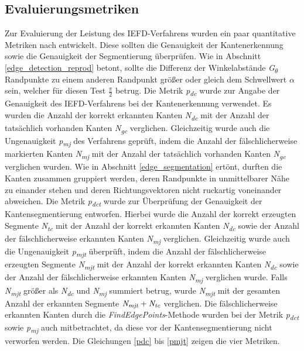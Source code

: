 \subsection{Evaluierungsmetriken} \label{evaluations_metrics}
Zur Evaluierung der Leistung des IEFD-Verfahrens wurden ein paar quantitative Metriken nach \textcite[10]{ni_edge_2016} entwickelt. Diese sollten die Genauigkeit der Kantenerkennung sowie die Genauigkeit der Segmentierung überprüfen. Wie in Abschnitt \ref{edge_detection_reprod} betont, sollte die Differenz der Winkelabstände \textit{G\textsubscript{$\theta$}} Randpunkte zu einem anderen Randpunkt größer oder gleich dem Schwellwert $\alpha$ sein, welcher für diesen Test $\frac{\pi}{2}$ betrug. Die Metrik \textit{p\textsubscript{dc}} wurde zur Angabe der Genauigkeit des IEFD-Verfahrens bei der Kantenerkennung verwendet. Es wurden die Anzahl der korrekt erkannten Kanten \textit{N\textsubscript{dc}} mit der Anzahl der tatsächlich vorhanden Kanten \textit{N\textsubscript{gc}} verglichen. Gleichzeitig wurde auch die Ungenauigkeit \textit{p\textsubscript{mj}} des Verfahrens geprüft, indem die Anzahl der fälschlicherweise markierten Kanten \textit{N\textsubscript{mj}} mit der Anzahl der tatsächlich vorhanden Kanten \textit{N\textsubscript{gc}} verglichen wurden. Wie in Abschnitt \ref{edge_segmentation} ertönt, durften die Kanten zusammen gruppiert werden, deren Randpunkte in unmittelbarer Nähe zu einander stehen und deren Richtungsvektoren nicht ruckartig voneinander abweichen. Die Metrik \textit{p\textsubscript{dct}} wurde zur Überprüfung der Genauigkeit der Kantensegmentierung entworfen. Hierbei wurde die Anzahl der korrekt erzeugten Segmente \textit{N\textsubscript{tc}} mit der Anzahl der korrekt erkannten Kanten \textit{N\textsubscript{dc}} sowie der Anzahl der fälschlicherweise erkannten Kanten \textit{N\textsubscript{mj}} verglichen. Gleichzeitig wurde auch die Ungenauigkeit \textit{p\textsubscript{mjt}} überprüft, indem die Anzahl der fälschlicherweise erzeugten Segmente \textit{N\textsubscript{mjt}} mit der Anzahl der korrekt erkannten Kanten \textit{N\textsubscript{dc}} sowie der Anzahl der fälschlicherweise erkannten Kanten \textit{N\textsubscript{mj}} verglichen wurde. Falls \textit{N\textsubscript{mjt}} größer als \textit{N\textsubscript{dc}} und \textit{N\textsubscript{mj}} summiert betrug, wurde \textit{N\textsubscript{mjt}} mit der gesamten Anzahl der erkannten Segmente $\textit{N\textsubscript{mjt}} + \textit{N\textsubscript{tc}}$ verglichen. Die fälschlicherweise erkannten Kanten durch die \textit{FindEdgePoints}-Methode wurden bei der Metrik \textit{p\textsubscript{dct}} sowie \textit{p\textsubscript{mj}} auch mitbetrachtet, da diese vor der Kantensegmentierung nicht verworfen werden. Die Gleichungen \ref{pdc} bis \ref{pmjt} zeigen die vier Metriken.

